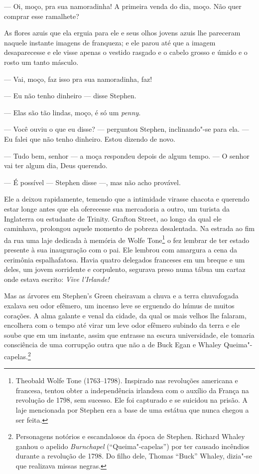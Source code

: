 --- Oi, moço, pra sua namoradinha! A primeira venda do dia,
moço. Não quer comprar esse ramalhete?

As flores azuis que ela erguia para ele e seus olhos jovens azuis lhe
pareceram naquele instante imagens de franqueza; e ele parou até que a
imagem desaparecesse e ele visse apenas o vestido rasgado e o cabelo
grosso e úmido e o rosto um tanto másculo.

 --- Vai, moço, faz isso pra sua namoradinha, faz!

 --- Eu não tenho dinheiro --- disse Stephen.

 --- Elas são tão lindas, moço, é só um \textit{penny}.

 --- Você ouviu o que eu disse? --- perguntou Stephen, inclinando"-se para ela.
 --- Eu falei que não tenho dinheiro. Estou dizendo de novo.

 --- Tudo bem, senhor --- a moça
respondeu depois de algum tempo. --- O senhor vai ter algum dia, Deus querendo.


 --- É possível --- Stephen disse ---, mas não acho provável.

Ele a deixou rapidamente, temendo que a intimidade virasse chacota e
querendo estar longe antes que ela oferecesse sua mercadoria a outro,
um turista da Inglaterra ou estudante de Trinity. Grafton Street, ao
longo da qual ele caminhava, prolongou aquele momento de pobreza
desalentada. Na estrada ao fim da rua uma laje dedicada à memória de
Wolfe Tone\footnote{ Theobald Wolfe Tone (1763--1798). Inspirado nas
revoluções americana e francesa, tentou obter a independência irlandesa
com o auxílio da França na revolução de 1798, sem sucesso. Ele foi
capturado e se suicidou na prisão. A laje mencionada por Stephen era a
base de uma estátua que nunca chegou a ser feita.} o fez lembrar de ter 
estado presente à sua inauguração com o pai. Ele lembrou com
amargura a cena da cerimônia espalhafatosa. Havia quatro delegados
franceses em um breque e um deles, um jovem sorridente e corpulento,
segurava preso numa tábua um cartaz onde estava escrito: \textit{Vive
l’Irlande!}

Mas as árvores em Stephen’s Green cheiravam a chuva e a
terra chuvafogada exalava seu odor efêmero, um incenso leve se erguendo 
do húmus de muitos corações. A alma galante e venal da cidade, da qual
os mais velhos lhe falaram, encolhera com o tempo até virar um leve
odor efêmero subindo da terra e ele soube que em um instante, assim que
entrasse na escura universidade, ele tomaria consciência de uma
corrupção outra que não a de Buck Egan e Whaley Queima"-capelas.\footnote{
Personagens notórios e escandalosos da época de Stephen. Richard Whaley
ganhou o apelido \textit{Burnchapel} (“Queima"-capelas”) por ter causado
incêndios durante a revolução de 1798. Do filho dele, Thomas “Buck”
Whaley, dizia"-se que realizava missas negras.}

